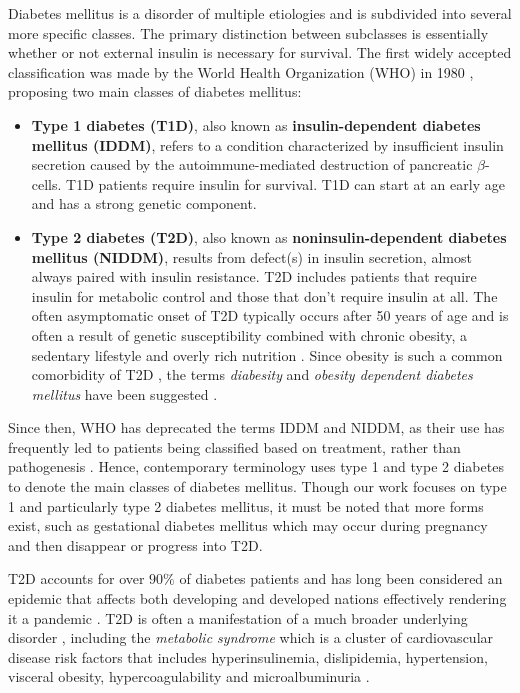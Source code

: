 Diabetes mellitus is a disorder of multiple etiologies and is subdivided into several more specific classes. The primary distinction between subclasses is essentially whether or not external insulin is necessary for survival. The first widely accepted classification was made by the World Health Organization (WHO) in 1980 \citep{WHO1980}, proposing two main classes of diabetes mellitus:
\begin{itemize}
\item \textbf{Type 1 diabetes (T1D)}, also known as \textbf{insulin-dependent diabetes mellitus (IDDM)}, refers to a condition characterized by insufficient insulin secretion caused by the autoimmune-mediated destruction of pancreatic $\beta$-cells. T1D patients require insulin for survival. T1D can start at an early age and has a strong genetic component.
\item \textbf{Type 2 diabetes (T2D)}, also known as \textbf{noninsulin-dependent diabetes mellitus (NIDDM)}, results from defect(s) in insulin secretion, almost always paired with insulin resistance. T2D includes patients that require insulin for metabolic control and those that don't require insulin at all. The often asymptomatic onset of T2D typically occurs after 50 years of age and is often a result of genetic susceptibility combined with chronic obesity, a sedentary lifestyle and overly rich nutrition \citep{zimmet2001global, smyth2006diabetes}. Since obesity is such a common comorbidity of T2D \citep{smyth2006diabetes}, the terms \emph{diabesity} and \emph{obesity dependent diabetes mellitus} have been suggested \citep{shafrir1996development, astrup2000redefining}.
\end{itemize}
Since then, WHO has deprecated the terms IDDM and NIDDM, as their use has frequently led to patients being classified based on treatment, rather than pathogenesis \citep{WHO1980}. Hence, contemporary terminology uses type 1 and type 2 diabetes to denote the main classes of diabetes mellitus. Though our work focuses on type 1 and particularly type 2 diabetes mellitus, it must be noted that more forms exist, such as gestational diabetes mellitus which may occur during pregnancy and then disappear or progress into T2D.

T2D accounts for over $90\%$ of diabetes patients and has long been considered an epidemic that affects both developing and developed nations \citep{zimmet1999diabetes,zimmet2001global,rocchini2002childhood,nathan2007impaired,chen2012worldwide, lam2012worldwide} effectively rendering it a pandemic \citep{beulens2010global}. T2D is often a manifestation of a much broader underlying disorder \citep{reaven1988role, zimmet1999diabetes}, including the \emph{metabolic syndrome} which is a cluster of cardiovascular disease risk factors that includes hyperinsulinemia, dislipidemia, hypertension, visceral obesity, hypercoagulability and microalbuminuria \citep{alberti2005metabolic, zimmet2001global, federation2010idf}. 

